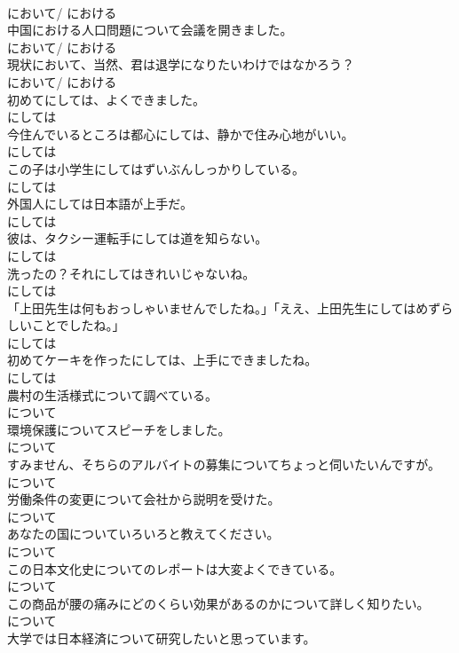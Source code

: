 \documentclass[8pt]{extreport}
\begin{document}
\begin{CJK}{UTF8}{min}
\\	において/ における
\\	中国における人口問題について会議を開きました。	
\\	において/ における
\\	現状において、当然、君は退学になりたいわけではなかろう？	
\\	において/ における
\\	初めてにしては、よくできました。	
\\	にしては
\\	今住んでいるところは都心にしては、静かで住み心地がいい。	
\\	にしては
\\	この子は小学生にしてはずいぶんしっかりしている。	
\\	にしては
\\	外国人にしては日本語が上手だ。	
\\	にしては
\\	彼は、タクシー運転手にしては道を知らない。	
\\	にしては
\\	洗ったの？それにしてはきれいじゃないね。	
\\	にしては
\\	「上田先生は何もおっしゃいませんでしたね。」「ええ、上田先生にしてはめずらしいことでしたね。」	
\\	にしては
\\	初めてケーキを作ったにしては、上手にできましたね。	
\\	にしては
\\	農村の生活様式について調べている。	
\\	について
\\	環境保護についてスピーチをしました。	
\\	について
\\	すみません、そちらのアルバイトの募集についてちょっと伺いたいんですが。	
\\	について
\\	労働条件の変更について会社から説明を受けた。	
\\	について
\\	あなたの国についていろいろと教えてください。	
\\	について
\\	この日本文化史についてのレポートは大変よくできている。	
\\	について
\\	この商品が腰の痛みにどのくらい効果があるのかについて詳しく知りたい。	
\\	について
\\	大学では日本経済について研究したいと思っています。	

\end{CJK}
\end{document}
